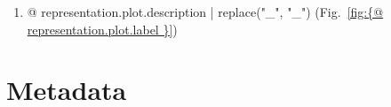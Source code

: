 \begin{enumerate}
\item {@ representation.plot.description | replace("_", "\_") } (Fig.~\ref{fig:{@ representation.plot.label }})
\end{enumerate}




\clearpage


\section{Metadata}




